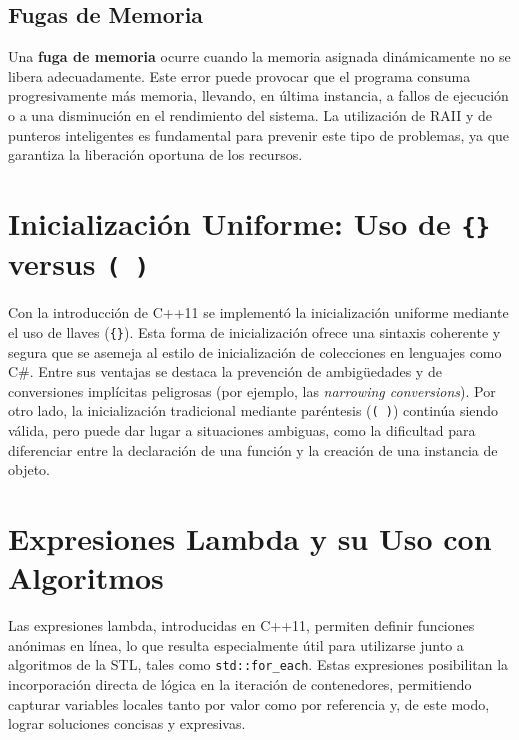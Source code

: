 \documentclass{article}
\begin{document}
\subsection{Fugas de Memoria}
Una \textbf{fuga de memoria} ocurre cuando la memoria asignada dinámicamente no se libera adecuadamente. Este error puede provocar que el programa consuma progresivamente más memoria, llevando, en última instancia, a fallos de ejecución o a una disminución en el rendimiento del sistema. La utilización de RAII y de punteros inteligentes es fundamental para prevenir este tipo de problemas, ya que garantiza la liberación oportuna de los recursos.

\section{Inicialización Uniforme: Uso de \texttt{\{\}} versus \texttt{( )}}
Con la introducción de C++11 se implementó la inicialización uniforme mediante el uso de llaves (\texttt{\{\}}). Esta forma de inicialización ofrece una sintaxis coherente y segura que se asemeja al estilo de inicialización de colecciones en lenguajes como C\#. Entre sus ventajas se destaca la prevención de ambigüedades y de conversiones implícitas peligrosas (por ejemplo, las \emph{narrowing conversions}). Por otro lado, la inicialización tradicional mediante paréntesis (\texttt{( )}) continúa siendo válida, pero puede dar lugar a situaciones ambiguas, como la dificultad para diferenciar entre la declaración de una función y la creación de una instancia de objeto.

\section{Expresiones Lambda y su Uso con Algoritmos}
Las expresiones lambda, introducidas en C++11, permiten definir funciones anónimas en línea, lo que resulta especialmente útil para utilizarse junto a algoritmos de la STL, tales como \texttt{std::for\_each}. Estas expresiones posibilitan la incorporación directa de lógica en la iteración de contenedores, permitiendo capturar variables locales tanto por valor como por referencia y, de este modo, lograr soluciones concisas y expresivas.
\end{document}
